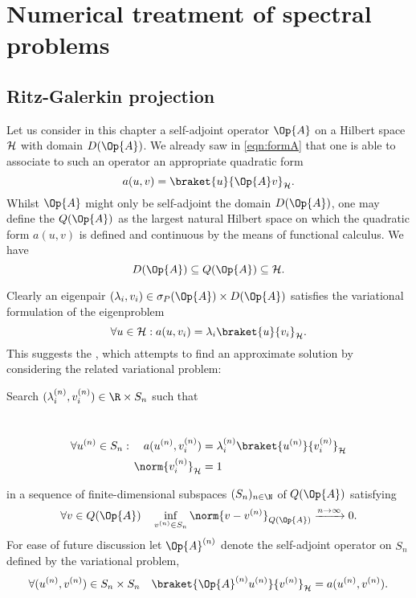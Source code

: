 \chapter{Numerical treatment of spectral problems}


\section{Ritz-Galerkin projection}
\label{sec:RitzGalerkin}
Let us consider in this chapter a self-adjoint operator $\Op{A}$
on a Hilbert space $\mathcal{H}$ with domain $D(\Op{A})$.
We already saw in \eqref{eqn:formA} that one is able
to associate to such an operator an appropriate quadratic form
\[ a(u, v) = \braket{u}{\Op{A} v}_\hilbert. \]
Whilst $\Op{A}$ might only be self-adjoint the domain $D(\Op{A})$,
one may define the  $Q(\Op{A})$ as the largest
natural Hilbert space on which the quadratic form $a(u, v)$
is defined and continuous by the means of functional calculus.
We have
\[ D(\Op{A}) \subseteq Q(\Op{A}) \subseteq \hilbert. \]

Clearly an eigenpair $(\lambda_i, v_i) \in \sigma_P(\Op{A}) \times D(\Op{A})$
satisfies the variational formulation of the eigenproblem
\[ \forall u \in \hilbert: a(u, v_i) = \lambda_i \braket{u}{v_i}_\hilbert. \]
This suggests the ,
which attempts to find an approximate solution by considering
the related variational problem:
\begin{center}
\begin{minipage}{0.9\textwidth}
	Search $(\lambda_i^{(n)}, v_i^{(n)}) \in \R \times S_n$ such that
\end{minipage} \\[-1.3em]
\begin{align}
	\label{eqn:varProblem1}
	\forall u^{(n)} \in S_n: \quad a(u^{(n)}, v_i^{(n)})
		&= \lambda_i^{(n)} \braket{u^{(n)}}{v_i^{(n)}}_\hilbert \\
	\label{eqn:varProblem2}
	\norm{v_i^{(n)}}_\hilbert &= 1
\end{align}
\end{center}
in a sequence of finite-dimensional subspaces $(S_n)_{n\in\N}$
of $Q(\Op{A})$ satisfying
\begin{equation}
	\forall v \in Q(\Op{A}) \quad \inf_{v^{(n)} \in S_n} \norm{v - v^{(n)}}_{Q(\Op{A})} \xrightarrow{n\to \infty} 0.
	\label{eqn:CondSubspaces}
\end{equation}
For ease of future discussion let $\Op{A}^{(n)}$ denote the self-adjoint
operator on $S_n$ defined by the variational problem, \ie
\[ \forall (u^{(n)}, v^{(n)}) \in S_n \times S_n \quad \braket{\Op{A}^{(n)} u^{(n)}}{v^{(n)}}_\hilbert = a(u^{(n)}, v^{(n)}). \]


